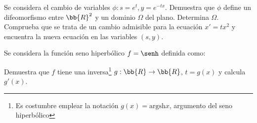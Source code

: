 \documentclass[12pt]{article}
\begin{document}
    \begin{ejercicio}
        Se considera el cambio de variables $\phi : s = e^t, y = e^{-tx}$. Demuestra que $\phi$ define un difeomorfismo entre $\bb{R}^2$ y un dominio $\Omega$ del plano.
        Determina $\Omega$.
        Comprueba que se trata de un cambio admisible para la ecuación $x' = tx^2$ y encuentra la nueva ecuación en las variables $(s,y)$.
    \end{ejercicio}

    \begin{ejercicio}
        Se considera la función seno hiperbólico $f=\senh$ definida como:

        Demuestra que $f$ tiene una inversa\footnote{Es costumbre emplear la notación $g(x) = \text{argsh} x$, argumento del seno hiperbólico} $g:\bb{R}\to\bb{R}$, $t=g(x)$ y calcula $g'(x)$.
    \end{ejercicio}
\end{document}

